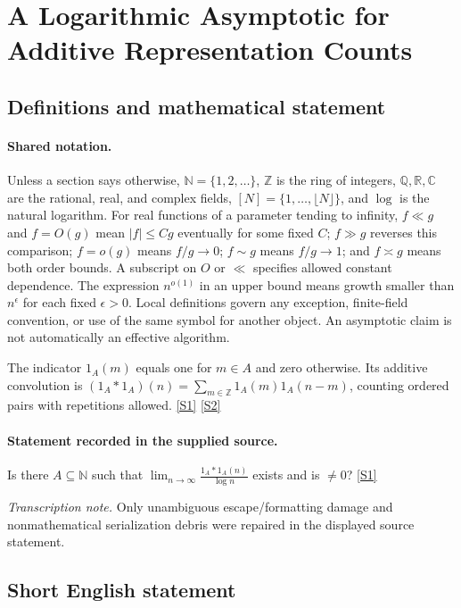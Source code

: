 \documentclass[11pt,a4paper]{article}
\newcommand{\N}{\mathbb{N}}
\newcommand{\Z}{\mathbb{Z}}
\newcommand{\Q}{\mathbb{Q}}
\newcommand{\R}{\mathbb{R}}
\newcommand{\C}{\mathbb{C}}
\newcommand{\sref}[2]{\hyperlink{source:#1:#2}{[S#2]}}
\begin{document}
\section{A Logarithmic Asymptotic for Additive Representation Counts}\label{statement}


\subsection{Definitions and mathematical statement}

\paragraph{Shared notation.}Unless a section says otherwise, $\N=\{1,2,\ldots\}$,
$\Z$ is the ring of integers, $\Q,\R,\C$ are the rational, real, and complex
fields, $[N]=\{1,\ldots,\lfloor N\rfloor\}$, and $\log$ is the natural
logarithm. For real functions of a parameter tending to infinity,
$f\ll g$ and $f=O(g)$ mean $|f|\leq Cg$ eventually for some fixed $C$;
$f\gg g$ reverses this comparison; $f=o(g)$ means $f/g\to0$;
$f\sim g$ means $f/g\to1$; and $f\asymp g$ means both order bounds.
A subscript on $O$ or $\ll$ specifies allowed constant dependence.
The expression $n^{o(1)}$ in an upper bound means growth smaller than
$n^\epsilon$ for each fixed $\epsilon>0$. Local definitions govern any
exception, finite-field convention, or use of the same symbol for another
object. An asymptotic claim is not automatically an effective algorithm.



The indicator $1_A(m)$ equals one for $m\in A$ and zero otherwise. Its additive convolution is $(1_A*1_A)(n)=\sum_{m\in\Z}1_A(m)1_A(n-m)$, counting ordered pairs with repetitions allowed. \sref{statement}{1} \sref{statement}{2}

\paragraph{Statement recorded in the supplied source.}
Is there $A\subseteq \mathbb{N}$ such that $ \lim_{n\to \infty}\frac{1_A\ast 1_A(n)}{\log n} $ exists and is $\neq 0$? \sref{statement}{1}

{\small\emph{Transcription note.} Only unambiguous escape/formatting damage and nonmathematical serialization debris were repaired in the displayed source statement.}

\subsection{Short English statement}
\end{document}
